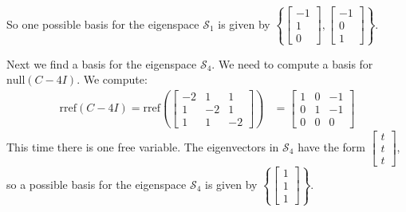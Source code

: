 \documentclass{ximera}
\begin{document}
\begin{example}
\begin{explanation}
So one possible basis for the eigenspace $\mathcal{S}_1$ is given by $\left\{\begin{bmatrix}-1\\1\\0\end{bmatrix}, \begin{bmatrix}-1\\0\\1\end{bmatrix}\right\}$.

Next we find a basis for the eigenspace $\mathcal{S}_4$.  We need to compute a basis for $\mbox{null}(C-4I)$.  We compute:
\begin{align*}\mbox{rref}(C-4I)=\mbox{rref}\left(\begin{bmatrix} -2 & 1 & 1\\ 1 & -2 & 1\\ 1 & 1 & -2\end{bmatrix}\right)&=\begin{bmatrix} 1 & 0 & -1\\ 0 & 1 & -1\\ 0 & 0 & 0\end{bmatrix}
\end{align*}
This time there is one free variable.  %
The eigenvectors in $\mathcal{S}_4$ have the form $\begin{bmatrix}t\\t\\t\end{bmatrix}$, so a possible basis for the eigenspace $\mathcal{S}_4$ is given by $\left\{\begin{bmatrix}1\\1\\1\end{bmatrix}\right\}$.
\end{explanation}
\end{example}
\end{document}
